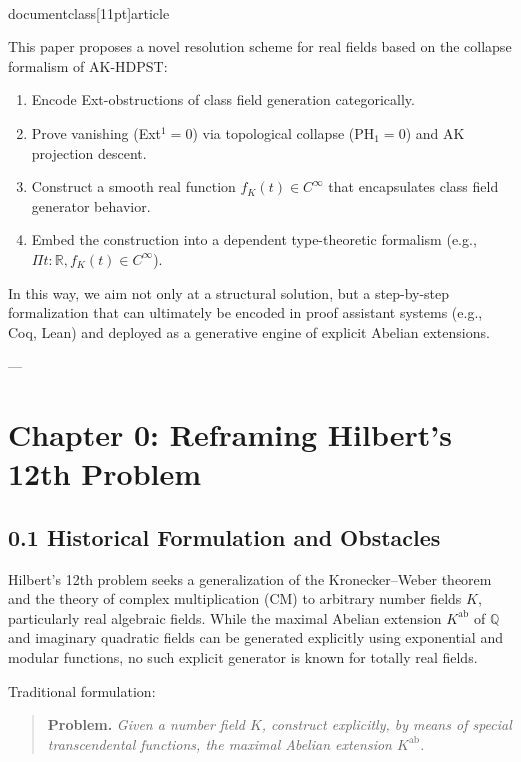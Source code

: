 \\documentclass[11pt]{article}
\begin{document}
This paper proposes a novel resolution scheme for real fields based on the collapse formalism of AK-HDPST:
\begin{enumerate}[label=\textbf{(\arabic*)}]
    \item Encode Ext-obstructions of class field generation categorically.
    \item Prove vanishing (Ext\(^1 = 0\)) via topological collapse (PH\(_1 = 0\)) and AK projection descent.
    \item Construct a smooth real function \( f_K(t) \in C^\infty \) that encapsulates class field generator behavior.
    \item Embed the construction into a dependent type-theoretic formalism (e.g., \( \Pi t:\mathbb{R}, f_K(t)\in C^\infty \)).
\end{enumerate}

In this way, we aim not only at a structural solution, but a step-by-step formalization that can ultimately be encoded in proof assistant systems (e.g., Coq, Lean) and deployed as a generative engine of explicit Abelian extensions.


---


\section*{Chapter 0: Reframing Hilbert’s 12th Problem}

\subsection*{0.1 Historical Formulation and Obstacles}

Hilbert’s 12th problem seeks a generalization of the Kronecker–Weber theorem and the theory of complex multiplication (CM) to arbitrary number fields \( K \), particularly real algebraic fields. While the maximal Abelian extension \( K^{\mathrm{ab}} \) of \( \mathbb{Q} \) and imaginary quadratic fields can be generated explicitly using exponential and modular functions, no such explicit generator is known for totally real fields.

Traditional formulation:
\begin{quote}
\textbf{Problem.} \emph{Given a number field \( K \), construct explicitly, by means of special transcendental functions, the maximal Abelian extension \( K^{\mathrm{ab}} \).}
\end{quote}
\end{document}

